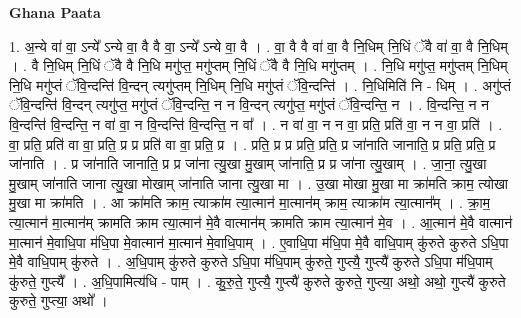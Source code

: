 \documentclass[17pt]{extarticle}
\begin{document}
\textbf{Ghana Paata } \newline

1. अ॒न्ये वा॑ वा॒ ऽन्ये᳚ ऽन्ये वा॒ वै वै वा॒ ऽन्ये᳚ ऽन्ये वा॒ वै । . वा॒ वै वै वा॑ वा॒ वै नि॒धिम् नि॒धिं ॅवै वा॑ वा॒ वै नि॒धिम् । . वै नि॒धिम् नि॒धिं ॅवै वै नि॒धि मगु॑प्त॒ मगु॑प्तम् नि॒धिं ॅवै वै नि॒धि मगु॑प्तम् । . नि॒धि मगु॑प्त॒ मगु॑प्तम् नि॒धिम् नि॒धि मगु॑प्तं ॅवि॒न्दन्ति॑ वि॒न्दन् त्यगु॑प्तम् नि॒धिम् नि॒धि मगु॑प्तं ॅवि॒न्दन्ति॑ । . नि॒धिमिति॑ नि - धिम् । . अगु॑प्तं ॅवि॒न्दन्ति॑ वि॒न्दन् त्यगु॑प्त॒ मगु॑प्तं ॅवि॒न्दन्ति॒ न न वि॒न्दन् त्यगु॑प्त॒ मगु॑प्तं ॅवि॒न्दन्ति॒ न । . वि॒न्दन्ति॒ न न वि॒न्दन्ति॑ वि॒न्दन्ति॒ न वा॑ वा॒ न वि॒न्दन्ति॑ वि॒न्दन्ति॒ न वा᳚ । . न वा॑ वा॒ न न वा॒ प्रति॒ प्रति॑ वा॒ न न वा॒ प्रति॑ । . वा॒ प्रति॒ प्रति॑ वा वा॒ प्रति॒ प्र प्र प्रति॑ वा वा॒ प्रति॒ प्र । . प्रति॒ प्र प्र प्रति॒ प्रति॒ प्र जा॑नाति जानाति॒ प्र प्रति॒ प्रति॒ प्र जा॑नाति । . प्र जा॑नाति जानाति॒ प्र प्र जा॑ना त्यु॒खा मु॒खाम् जा॑नाति॒ प्र प्र जा॑ना त्यु॒खाम् । . जा॒ना॒ त्यु॒खा मु॒खाम् जा॑नाति जाना त्यु॒खा मोखाम् जा॑नाति जाना त्यु॒खा मा । . उ॒खा मोखा मु॒खा मा क्रा॑मति क्राम॒ त्योखा मु॒खा मा क्रा॑मति । . आ क्रा॑मति क्राम॒ त्याक्रा॑म त्या॒त्मान॑ मा॒त्मान॑म् क्राम॒ त्याक्रा॑म त्या॒त्मान᳚म् । . क्रा॒म॒ त्या॒त्मान॑ मा॒त्मान॑म् क्रामति क्राम त्या॒त्मान॑ मे॒वै वात्मान॑म् क्रामति क्राम त्या॒त्मान॑ मे॒व । . आ॒त्मान॑ मे॒वै वात्मान॑ मा॒त्मान॑ मे॒वाधि॒पा म॑धि॒पा मे॒वात्मान॑ मा॒त्मान॑ मे॒वाधि॒पाम् । . ए॒वाधि॒पा म॑धि॒पा मे॒वै वाधि॒पाम् कु॑रुते कुरुते ऽधि॒पा मे॒वै वाधि॒पाम् कु॑रुते । . अ॒धि॒पाम् कु॑रुते कुरुते ऽधि॒पा म॑धि॒पाम् कु॑रुते॒ गुप्त्यै॒ गुप्त्यै॑ कुरुते ऽधि॒पा म॑धि॒पाम् कु॑रुते॒ गुप्त्यै᳚ । . अ॒धि॒पामित्य॑धि - पाम् । . कु॒रु॒ते॒ गुप्त्यै॒ गुप्त्यै॑ कुरुते कुरुते॒ गुप्त्या॒ अथो॒ अथो॒ गुप्त्यै॑ कुरुते कुरुते॒ गुप्त्या॒ अथो᳚ । \newline
\end{document}

